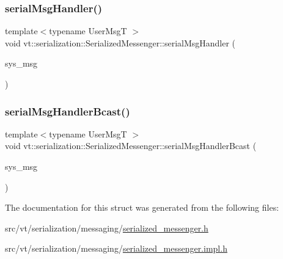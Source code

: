 \mbox{\label{structvt_1_1serialization_1_1_serialized_messenger_aad74b93ed6e38beb26ce31d69eb85a71}} 
\subsubsection{\texorpdfstring{serial\+Msg\+Handler()}{serialMsgHandler()}}
{\footnotesize\ttfamily template$<$typename User\+MsgT $>$ \\
void vt\+::serialization\+::\+Serialized\+Messenger\+::serial\+Msg\+Handler (\begin{DoxyParamCaption}\item[{\hyperlink{structvt_1_1serialization_1_1_serialized_messenger_a279027d1664b42cf7f288dc3fc9c3014}{Serial\+Wrapper\+Msg\+Type}$<$ User\+MsgT $>$ $\ast$}]{sys\+\_\+msg }\end{DoxyParamCaption})\hspace{0.3cm}{\ttfamily [static]}}

\mbox{\label{structvt_1_1serialization_1_1_serialized_messenger_adc342b3e5a4a536182f6045c5fe485b7}} 
\subsubsection{\texorpdfstring{serial\+Msg\+Handler\+Bcast()}{serialMsgHandlerBcast()}}
{\footnotesize\ttfamily template$<$typename User\+MsgT $>$ \\
void vt\+::serialization\+::\+Serialized\+Messenger\+::serial\+Msg\+Handler\+Bcast (\begin{DoxyParamCaption}\item[{\hyperlink{structvt_1_1serialization_1_1_serialized_messenger_a279027d1664b42cf7f288dc3fc9c3014}{Serial\+Wrapper\+Msg\+Type}$<$ User\+MsgT $>$ $\ast$}]{sys\+\_\+msg }\end{DoxyParamCaption})\hspace{0.3cm}{\ttfamily [static]}}



The documentation for this struct was generated from the following files\+:\begin{DoxyCompactItemize}
\item 
src/vt/serialization/messaging/\hyperlink{serialized__messenger_8h}{serialized\+\_\+messenger.\+h}\item 
src/vt/serialization/messaging/\hyperlink{serialized__messenger_8impl_8h}{serialized\+\_\+messenger.\+impl.\+h}\end{DoxyCompactItemize}
